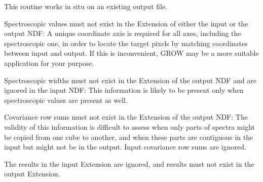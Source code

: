 {{      This routine works in situ on an existing output file.

      Spectroscopic values must not exist in the Extension of either
      the input or the output NDF: A unique coordinate axis is
      required for all axes, including the spectroscopic one, in
      order to locate the target pixels by matching coordinates
      between input and output. If this is inconvenient, GROW may be
      a more suitable application for your purpose.

      Spectroscopic widths must not exist in the Extension of the
      output NDF and are ignored in the input NDF: This information
      is likely to be present only when spectroscopic values are
      present as well.

      Covariance row sums must not exist in the Extension of the
      output NDF: The validity of this information is difficult to
      assess when only parts of spectra might be copied from one cube
      to another, and when these parts are contiguous in the input
      but might not be in the output. Input covariance row sums are
      ignored.

      The results in the input Extension are ignored, and results
      must not exist in the output Extension.
   }
}

